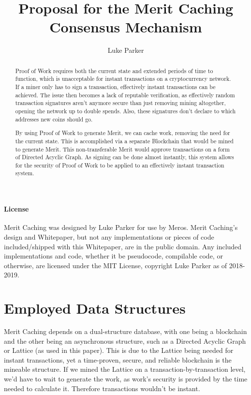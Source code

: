 \documentclass[14pt]{article}
\title{Proposal for the Merit Caching Consensus Mechanism}
\author{Luke Parker}
\begin{document}
\maketitle

\label{sec:abstract}
\begin{abstract}
Proof of Work requires both the current state and extended periods of time to function, which is unacceptable for instant transactions on a cryptocurrency network. If a miner only has to sign a transaction, effectively instant transactions can be achieved. The issue then becomes a lack of reputable verification, as effectively random transaction signatures aren't anymore secure than just removing mining altogether, opening the network up to double spends. Also, these signatures don't declare to which addresses new coins should go.

By using Proof of Work to generate Merit, we can cache work, removing the need for the current state. This is accomplished via a separate Blockchain that would be mined to generate Merit. This non-transferable Merit would approve transactions on a form of Directed Acyclic Graph. As signing can be done almost instantly, this system allows for the security of Proof of Work to be applied to an effectively instant transaction system.
\end{abstract}

\label{sec:license}
\paragraph{License}
Merit Caching was designed by Luke Parker for use by Meros. Merit Caching's design and Whitepaper, but not any implementations or pieces of code included/shipped with this Whitepaper, are in the public domain. Any included implementations and code, whether it be pseudocode, compilable code, or otherwise, are licensed under the MIT License, copyright Luke Parker as of 2018-2019.

\newpage

\label{sec:toc}
\setcounter{tocdepth}{3}
\tableofcontents

\newpage

\label{sec:1}
\section{Employed Data Structures}
Merit Caching depends on a dual-structure database, with one being a blockchain and the other being an asynchronous structure, such as a Directed Acyclic Graph or Lattice (as used in this paper). This is due to the Lattice being needed for instant transactions, yet a time-proven, secure, and reliable blockchain is the mineable structure. If we mined the Lattice on a transaction-by-transaction level, we'd have to wait to generate the work, as work's security is provided by the time needed to calculate it. Therefore transactions wouldn't be instant.
\end{document}
